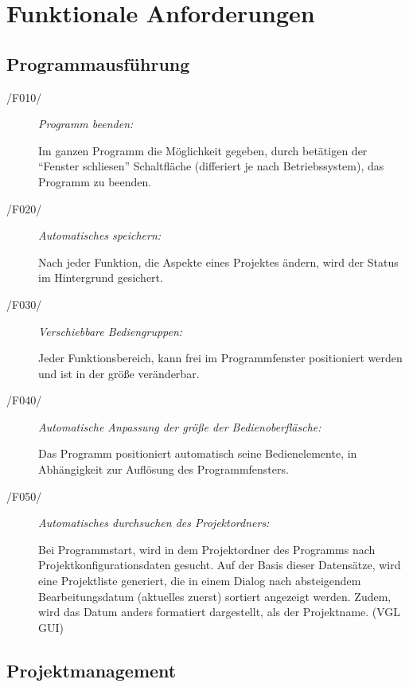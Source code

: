 \section{Funktionale Anforderungen}

\subsection{Programmausführung}
	
	\begin{description}
		
		\item[/F010/] \textit{Programm beenden:}\par Im ganzen Programm die Möglichkeit gegeben, durch betätigen der "`Fenster schliesen"' Schaltfläche (differiert je nach Betriebssystem), das Programm zu beenden.
		
		\item[/F020/] \textit{Automatisches speichern:}\par Nach jeder Funktion, die Aspekte eines Projektes ändern, wird der Status im Hintergrund gesichert.
		
		\item[/F030/] \textit{Verschiebbare Bediengruppen:}\par Jeder Funktionsbereich, kann frei im Programmfenster positioniert werden und ist in der größe veränderbar.
		
		\item[/F040/] \textit{Automatische Anpassung der größe der Bedienoberfläsche:}\par Das Programm positioniert automatisch seine Bedienelemente, in Abhängigkeit zur Auflösung des Programmfensters.
		
		\item[/F050/] \textit{Automatisches durchsuchen des Projektordners:}\par Bei Programmstart, wird in dem Projektordner des Programms nach Projektkonfigurationsdaten gesucht. Auf der Basis dieser Datensätze, wird eine Projektliste generiert, die in einem Dialog nach absteigendem Bearbeitungsdatum (aktuelles zuerst) sortiert angezeigt werden. Zudem, wird das Datum anders formatiert dargestellt, als der Projektname. (VGL GUI)
		
	\end{description}

\subsection{Projektmanagement}
	
